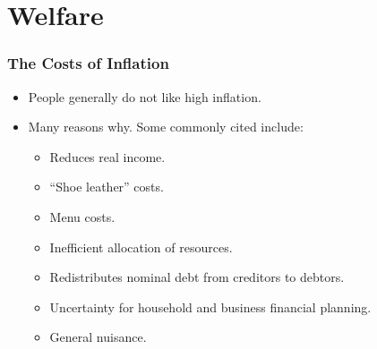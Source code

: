 \documentclass[english,xcolor=svgnames]{beamer}
\begin{document}

\section{Welfare}

\begin{frame}
\frametitle{The Costs of Inflation}
\begin{itemize}
	\item People generally do not like high inflation.
	\item Many reasons why. Some commonly cited include:
	\begin{itemize}
		\item Reduces real income.
		\item ``Shoe leather'' costs.
		\item Menu costs.
		\item Inefficient allocation of resources.
		\item Redistributes nominal debt from creditors to debtors.
		\item Uncertainty for household and business financial planning.
		\item General nuisance.
	\end{itemize}
\end{itemize}
\end{frame}
\end{document}
